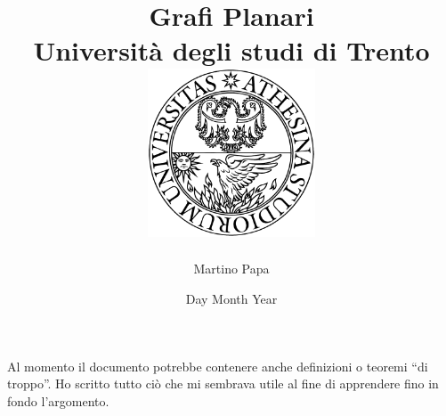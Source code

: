 \documentclass[12pt]{report}
\title{
{Grafi Planari}\\
{\large Università degli studi di Trento} \bigskip \\
{\includegraphics[width=50mm]{logo_bn.png}}
}
\author{Martino Papa}
\date{Day Month Year}
\theoremstyle{definition}
\theoremstyle{plain}
\begin{document}
\maketitle
\tableofcontents

Al momento il documento potrebbe contenere anche definizioni o teoremi “di troppo”. Ho scritto tutto ciò che mi sembrava utile al fine di apprendere fino in fondo l'argomento.







% 



\end{document}

